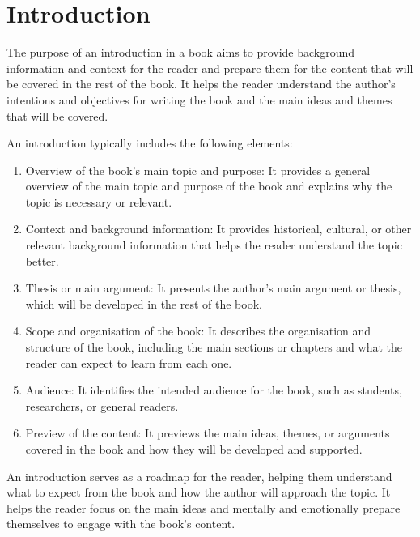 \chapter{Introduction}

The purpose of an introduction in a book aims to provide background information and context for the reader and prepare them for the content that will be covered in the rest of the book. It helps the reader understand the author's intentions and objectives for writing the book and the main ideas and themes that will be covered.

An introduction typically includes the following elements:

\begin{enumerate}
    \item Overview of the book's main topic and purpose: It provides a general overview of the main topic and purpose of the book and explains why the topic is necessary or relevant.

    \item Context and background information: It provides historical, cultural, or other relevant background information that helps the reader understand the topic better.

    \item Thesis or main argument: It presents the author's main argument or thesis, which will be developed in the rest of the book.

    \item Scope and organisation of the book: It describes the organisation and structure of the book, including the main sections or chapters and what the reader can expect to learn from each one.

    \item Audience: It identifies the intended audience for the book, such as students, researchers, or general readers.

    \item Preview of the content: It previews the main ideas, themes, or arguments covered in the book and how they will be developed and supported.

\end{enumerate}

An introduction serves as a roadmap for the reader, helping them understand what to expect from the book and how the author will approach the topic. It helps the reader focus on the main ideas and mentally and emotionally prepare themselves to engage with the book's content.